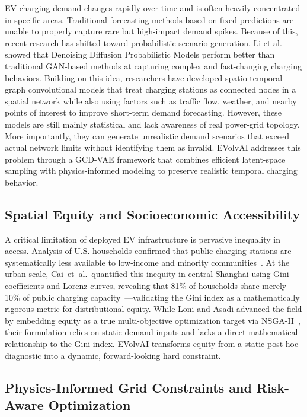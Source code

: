 \documentclass[conference]{IEEEtran}
\begin{document}
EV charging demand changes rapidly over time and is often heavily concentrated in specific areas. Traditional forecasting methods based on fixed predictions are unable to properly capture rare but high-impact demand spikes. Because of this, recent research has shifted toward probabilistic scenario generation. Li et al. showed that Denoising Diffusion Probabilistic Models perform better than traditional GAN-based methods at capturing complex and fast-changing charging behaviors. Building on this idea, researchers have developed spatio-temporal graph convolutional models that treat charging stations as connected nodes in a spatial network while also using factors such as traffic flow, weather, and nearby points of interest to improve short-term demand forecasting. However, these models are still mainly statistical and lack awareness of real power-grid topology. More importantly, they can generate unrealistic demand scenarios that exceed actual network limits without identifying them as invalid. EVolvAI addresses this problem through a GCD-VAE framework that combines efficient latent-space sampling with physics-informed modeling to preserve realistic temporal charging behavior.

\subsection{Spatial Equity and Socioeconomic Accessibility}

A critical limitation of deployed EV infrastructure is pervasive inequality in access. Analysis of U.S. households confirmed that public charging stations are systematically less available to low-income and minority communities~\cite{ref3}. At the urban scale, Cai~et~al.\ quantified this inequity in central Shanghai using Gini coefficients and Lorenz curves, revealing that 81\% of households share merely 10\% of public charging capacity~\cite{ref4}---validating the Gini index as a mathematically rigorous metric for distributional equity. While Loni and Asadi advanced the field by embedding equity as a true multi-objective optimization target via NSGA-II~\cite{ref5}, their formulation relies on static demand inputs and lacks a direct mathematical relationship to the Gini index. EVolvAI transforms equity from a static post-hoc diagnostic into a dynamic, forward-looking hard constraint.

\subsection{Physics-Informed Grid Constraints and Risk-Aware Optimization}
\end{document}
